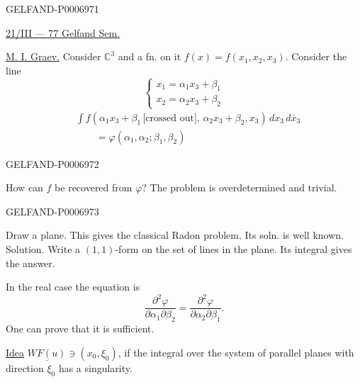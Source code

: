 \begin{GelfandAdjacentEvidence}{GELFAND-P000697}{1}

\underline{21/III --- 77 }\qquad\underline{\underline{Gelfand Sem.}}

\underline{M. I. Graev.}
Consider \(\mathbb C^3\) and a fn. on it \(f(x)=f(x_1,x_2,x_3)\).
Consider the line
\[
\begin{cases}
x_1=\alpha_1x_3+\beta_1\\
x_2=\alpha_2x_3+\beta_2
\end{cases}
\]
\[
\begin{aligned}
&\int f(\alpha_1x_3+\beta_1\,\text{[crossed out]},\,
\alpha_2x_3+\beta_2,x_3)\,dx_3\,d\bar{x}_3\\
&\qquad=\varphi(\alpha_1,\alpha_2;\beta_1,\beta_2)
\end{aligned}
\]
\end{GelfandAdjacentEvidence}
\begin{GelfandAdjacentEvidence}{GELFAND-P000697}{2}

How can \(f\) be recovered from \(\varphi\)? The problem is overdetermined and trivial.

\end{GelfandAdjacentEvidence}
\begin{GelfandAdjacentEvidence}{GELFAND-P000697}{3}

Draw a plane. This gives the classical Radon problem. Its soln. is well known.
Solution. Write a \((1,1)\)-form on the set of lines in the plane.
Its integral gives the answer.

In the real case the equation is
\[
\frac{\partial^2\varphi}{\partial\alpha_1\partial\beta_2}
=\frac{\partial^2\varphi}{\partial\alpha_2\partial\beta_1}.
\]
One can prove that it is sufficient.

\underline{Idea}
\(\underline{WF(u)}\ni(x_0,\xi_0)\), if the integral over the system of parallel planes with direction \(\xi_0\) has a singularity.
\end{GelfandAdjacentEvidence}
